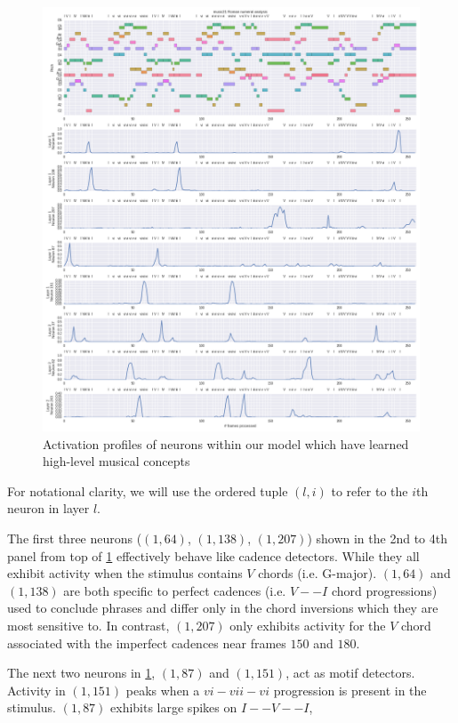 \documentclass[dissertation.tex]{subfiles}
\begin{document}
\begin{figure}[htpb]
    \centering
    \includegraphics[width=1.0\linewidth]{Figures/model-analysis-cells-individual.png}
    \caption{Activation profiles of neurons within our model which have learned
    high-level musical concepts}
    \label{fig:model-analysis-cells-individual}
\end{figure}

For notational clarity, we will use the ordered tuple $(l,i)$ to refer to the
$i$th neuron in layer $l$.

The first three neurons ($(1,64)$, $(1,138)$, $(1,207)$) shown in the 2nd to
4th panel from top of \cref{fig:model-analysis-cells-individual} effectively
behave like cadence detectors. While they all exhibit activity when the
stimulus contains $V$ chords (i.e. G-major). $(1,64)$ and $(1,138)$ are both
specific to perfect cadences (i.e. $V -- I$ chord progressions) used to
conclude phrases and differ only in the chord inversions which they are most
sensitive to. In contrast, $(1,207)$ only exhibits activity for the $V$ chord
associated with the imperfect cadences near frames $150$ and $180$.

The next two neurons in \cref{fig:model-analysis-cells-individual}, $(1,87)$
and $(1,151)$, act as motif detectors. Activity in $(1,151)$ peaks when a $vi-vii-vi$
progression is present in the stimulus. $(1,87)$ exhibits large spikes on $I--V--I$,
\end{document}

